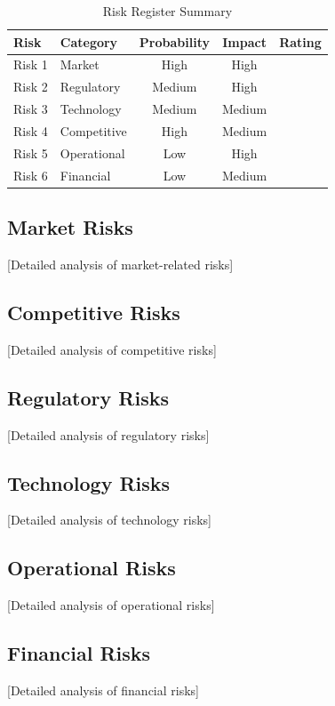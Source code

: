 \documentclass[11pt,letterpaper]{report}
\begin{document}
\begin{table}[htbp]
\centering
\caption{Risk Register Summary}
\begin{tabular}{@{}llccl@{}}
\toprule
\textbf{Risk} & \textbf{Category} & \textbf{Probability} & \textbf{Impact} & \textbf{Rating} \\
\midrule
Risk 1 & Market & High & High & \riskhigh{} \\
\rowcolor{tablealt} Risk 2 & Regulatory & Medium & High & \riskhigh{} \\
Risk 3 & Technology & Medium & Medium & \riskmedium{} \\
\rowcolor{tablealt} Risk 4 & Competitive & High & Medium & \riskmedium{} \\
Risk 5 & Operational & Low & High & \riskmedium{} \\
\rowcolor{tablealt} Risk 6 & Financial & Low & Medium & \risklow{} \\
\bottomrule
\end{tabular}
\label{tab:risk_register}
\end{table}

\subsection{Market Risks}
[Detailed analysis of market-related risks]

\subsection{Competitive Risks}
[Detailed analysis of competitive risks]

\subsection{Regulatory Risks}
[Detailed analysis of regulatory risks]

\subsection{Technology Risks}
[Detailed analysis of technology risks]

\subsection{Operational Risks}
[Detailed analysis of operational risks]

\subsection{Financial Risks}
[Detailed analysis of financial risks]
\end{document}
